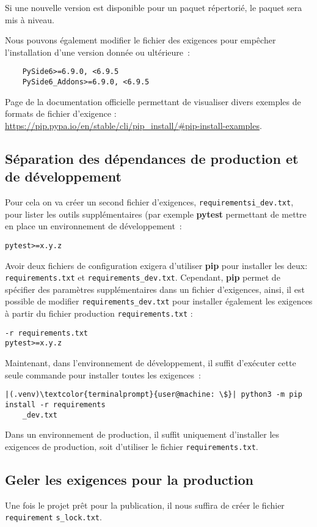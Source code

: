 Si une nouvelle version est disponible pour un paquet répertorié, le paquet sera mis à niveau.

Nous pouvons également modifier le fichier des exigences pour empêcher l’installation d'une version donnée ou ultérieure :
\begin{verbatim}
    PySide6>=6.9.0, <6.9.5
    PySide6_Addons>=6.9.0, <6.9.5
\end{verbatim}

Page de la documentation officielle permettant de visualiser divers exemples de formats de fichier d'exigence : \url{https://pip.pypa.io/en/stable/cli/pip_install/#pip-install-examples}.

\subsection*{Séparation des dépendances de production et de développement}
Pour cela on va créer un second fichier d'exigences, \texttt{requirementsi\_dev.txt}, pour lister les outils supplémentaires (par exemple \textbf{pytest} permettant de mettre en place un environnement de développement :
\begin{verbatim}
pytest>=x.y.z
\end{verbatim}

Avoir deux fichiers de configuration exigera d'utiliser \textbf{pip} pour installer les deux: \texttt{requirements.txt} et \texttt{requirements\_dev.txt}. Cependant, \textbf{pip} permet de spécifier des paramètres supplémentaires dans un fichier d'exigences, ainsi, il est possible de modifier \texttt{requirements\_dev.txt} pour installer également les exigences à partir du fichier production \texttt{requirements.txt} :
\begin{verbatim}
-r requirements.txt
pytest>=x.y.z
\end{verbatim}

Maintenant, dans l'environnement de développement, il suffit d’exécuter cette seule commande pour installer toutes les exigences :
\begin{lstlisting}[style=terminal]
|(.venv)\textcolor{terminalprompt}{user@machine: \$}| python3 -m pip install -r requirements
    _dev.txt
\end{lstlisting}

Dans un environnement de production, il suffit uniquement d’installer les exigences de production, soit d'utiliser le fichier \texttt{requirements.txt}.

\subsection*{Geler les exigences pour la production}
Une fois le projet prêt pour la publication, il nous suffira de créer le fichier \texttt{requirement} \texttt{s\_lock.txt}.

